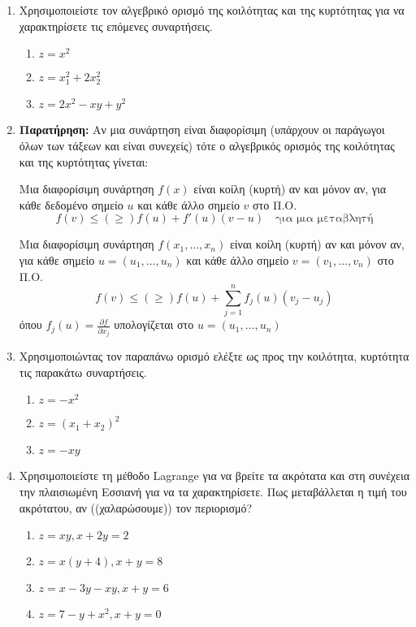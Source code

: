 \documentclass[a4paper,12pt]{article}
\begin{document}
\begin{enumerate}
\item Χρησιμοποιείστε τον αλγεβρικό ορισμό της κοιλότητας και της κυρτότητας για να χαρακτηρίσετε τις επόμενες συναρτήσεις.

\begin{enumerate}
\item $z=x^2$
\item $z=x_1^2+2x_2^2$
\item $z=2x^2-xy+y^2$
\end{enumerate}



\item {\bfseries Παρατήρηση:} Αν μια συνάρτηση είναι διαφορίσιμη (υπάρχουν οι παράγωγοι όλων των τάξεων και είναι συνεχείς) τότε ο αλγεβρικός ορισμός της κοιλότητας και της κυρτότητας γίνεται:

Μια διαφορίσιμη συνάρτηση $f(x)$ είναι κοίλη (κυρτή) αν και μόνον αν, για κάθε δεδομένο σημείο $u$ και κάθε άλλο σημείο $v$ στο Π.Ο.
\[
f(v)\leq (\geq) f(u)+f'(u)(v-u)\quad \text{για μια μεταβλητή} 
\]

Μια διαφορίσιμη συνάρτηση $f(x_1,\ldots,x_n)$ είναι κοίλη (κυρτή) αν και μόνον αν, για κάθε σημείο $u=(u_1,\ldots,u_n)$ και κάθε άλλο σημείο $v=(v_1,\ldots,v_n)$  στο Π.Ο.
\[
f(v)\leq (\geq) f(u)+\sum\limits_{j=1}^nf_j(u)(v_j-u_j)
\]
όπου $f_j(u)=\frac{\partial f}{\partial x_j}$ υπολογίζεται στο $u=(u_1,\ldots,u_n)$

\item Χρησιμοποιώντας τον παραπάνω ορισμό ελέξτε ως προς την κοιλότητα, κυρτότητα τις παρακάτω συναρτήσεις.

\begin{enumerate}
\item $z=-x^2$
\item $z=(x_1+x_2)^2$
\item $z=-xy$
\end{enumerate}

\item Χρησιμοποιείστε τη μέθοδο \textlatin{Lagrange} για να βρείτε τα ακρότατα και στη συνέχεια την πλαισιωμένη Εσσιανή για να τα χαρακτηρίσετε. Πως μεταβάλλεται η τιμή του ακρότατου, αν ((χαλαρώσουμε)) τον περιορισμό?

\begin{enumerate}
\item $z=xy, x+2y=2$
\item $z=x(y+4), x+y=8$
\item $z=x-3y-xy, x+y=6$
\item $z=7-y+x^2, x+y=0$
\end{enumerate}

\end{enumerate}
\end{document}
